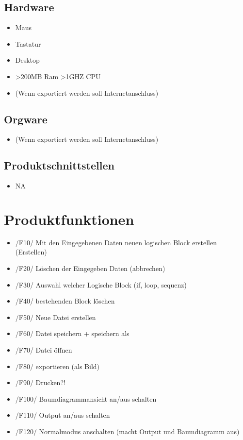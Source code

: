 \documentclass[a4paper,10pt]{report}
\begin{document}
\subsection{Hardware}
\begin{itemize}
\item Maus
\item Tastatur
\item Desktop
\item >200MB Ram >1GHZ CPU
\item (Wenn exportiert werden soll Internetanschluss)
\end{itemize}
\subsection{Orgware}
\begin{itemize}
\item (Wenn exportiert werden soll Internetanschluss)
\end{itemize}
\subsection{Produktschnittstellen}
\begin{itemize}
\item NA

\end{itemize}

\section{Produktfunktionen}
\begin{itemize}
\item /F10/ Mit den Eingegebenen Daten neuen logischen Block erstellen (Erstellen)
\item /F20/ Löschen der Eingegeben Daten (abbrechen)
\item /F30/ Auswahl welcher Logische Block (if, loop, sequenz)
\item /F40/ bestehenden Block löschen
\item /F50/ Neue Datei erstellen
\item /F60/ Datei speichern + speichern als
\item /F70/ Datei öffnen
\item /F80/ exportieren (als Bild)
\item /F90/ Drucken?!
\item /F100/ Baumdiagrammansicht an/aus schalten
\item /F110/ Output an/aus schalten
\item /F120/ Normalmodus anschalten (macht Output und Baumdiagramm aus)
\end{itemize}
\end{document}
